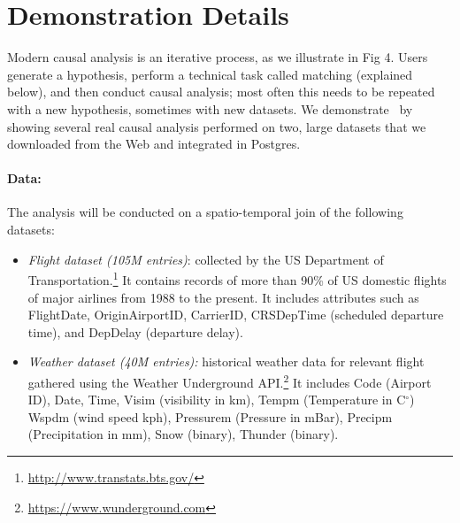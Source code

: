 \section{Demonstration Details}
\label{sec:dd}
Modern causal analysis is an iterative process, as we illustrate in Fig 4.
Users generate a hypothesis, perform a technical task called matching (explained below),
  and then conduct causal analysis; most often this needs to be repeated with a new hypothesis,
  sometimes with new datasets.
We demonstrate \GSQL\ by showing several real causal analysis performed on two,
  large datasets that we downloaded from the Web and integrated in Postgres.


    \paragraph{\bf Data:} The analysis will be conducted on a spatio-temporal join of the following datasets:
 \begin{itemize}
   \item {\it Flight dataset (105M entries)}: collected by the US
Department of Transportation.\footnote{\url{http://www.transtats.bts.gov/}} It contains
records of more than 90\% of US domestic flights of major airlines
from 1988 to the present. It includes attributes such as FlightDate, OriginAirportID, CarrierID, CRSDepTime (scheduled departure time), and DepDelay (departure delay).
   \item {\it Weather dataset (40M entries):} historical weather data for relevant flight gathered using the Weather Underground API.\footnote{\url{https://www.wunderground.com}} It includes Code (Airport ID),
Date, Time,  Visim (visibility in km),
  Tempm (Temperature in C$^{\circ}$)
  Wspdm (wind speed kph), Pressurem (Pressure in mBar), Precipm  (Precipitation in mm), Snow (binary), Thunder (binary).
 \end{itemize}





